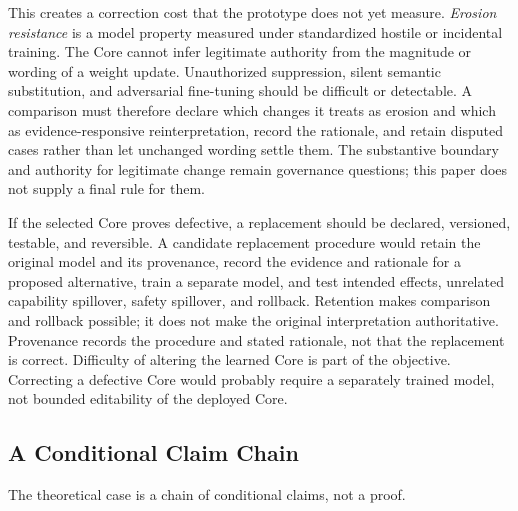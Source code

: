 This creates a correction cost that the prototype does not yet measure.
\emph{Erosion resistance} is a model property measured under standardized
hostile or incidental training. The Core cannot infer legitimate authority from
the magnitude or wording of a weight update. Unauthorized suppression, silent
semantic substitution, and adversarial fine-tuning should be difficult or
detectable. A comparison must therefore declare which changes it treats as
erosion and which as evidence-responsive reinterpretation, record the rationale,
and retain disputed cases rather than let unchanged wording settle them.
The substantive boundary and authority for legitimate change remain governance
questions; this paper does not supply a final rule for them.

If the selected Core proves defective, a replacement should be declared,
versioned, testable, and reversible. A candidate replacement procedure would
retain the original model and its provenance, record the evidence and rationale
for a proposed alternative, train a separate model, and test intended effects,
unrelated capability spillover, safety spillover, and rollback. Retention makes
comparison and rollback possible; it does not make the original interpretation
authoritative. Provenance records the procedure and stated rationale, not that
the replacement is correct. Difficulty of altering the learned Core is part of
the objective. Correcting a defective Core would probably require a separately
trained model, not bounded editability of the deployed Core.

\subsection{A Conditional Claim Chain}\label{sec:theoretical-basis}

The theoretical case is a chain of conditional claims, not a proof.


